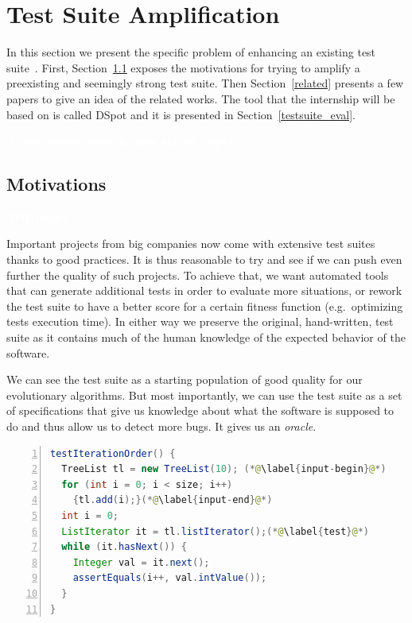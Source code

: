 \documentclass[11pt]{sdm}
\newcommand{\addref}[1]{\colorbox{TealBlue!100}{\textcolor{white}{\textbf{$[$\ifx&#1&\ \else#1\fi$]$}}}}
\newcommand{\todo}[1]{\colorbox{Red!75}{\textcolor{white}{\textbf{TODO\ifx&#1&\else: #1\fi}}}}
\newcommand{\dspot}{DSpot\xspace}
\begin{document}
\section{Test Suite Amplification}
\label{tsa}
In this section we present the specific problem of enhancing an existing test suite~\cite{danglot2017emerging}.
First, Section~\ref{motiv_tsa} exposes the motivations for trying to amplify a preexisting and seemingly strong test suite.
Then Section~\ref{related} presents a few papers to give an idea of the related works.
The tool that the internship will be based on is called \dspot{} and it is presented in Section~\ref{testsuite_eval}.

\addref{new survey paper}

\subsection{Motivations}
\label{motiv_tsa}
\todo{}

Important projects from big companies now come with extensive test suites thanks to good practices.
It is thus reasonable to try and see if we can push even further the quality of such projects.
To achieve that, we want automated tools that can generate additional tests in order to evaluate more situations, or rework the test suite to have a better score for a certain fitness function (e.g.\ optimizing tests execution time).
In either way we preserve the original, hand-written, test suite as it contains much of the human knowledge of the expected behavior of the software.

We can see the test suite as a starting population of good quality for our evolutionary algorithms.
But most importantly, we can use the test suite as a set of specifications that give us knowledge about what the software is supposed to do and thus allow us to detect more bugs.
It gives us an \textit{oracle}.

\begin{lstlisting}[caption={An archetypal example of an object-oriented test case  (taken from the Apache Commons Collections, in the class TreeListTest, line 270)},label=lst:archetype,float,language=java,numbers=left]
testIterationOrder() {
  TreeList tl = new TreeList(10); (*@\label{input-begin}@*)
  for (int i = 0; i < size; i++)
    {tl.add(i);}(*@\label{input-end}@*)
  int i = 0;
  ListIterator it = tl.listIterator();(*@\label{test}@*)
  while (it.hasNext()) {
    Integer val = it.next();
    assertEquals(i++, val.intValue());
  }
}
\end{lstlisting}
\end{document}
